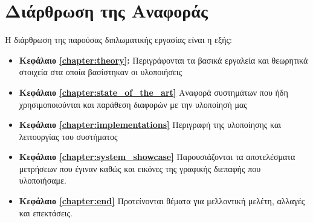 \newpage

\section{Διάρθρωση της Αναφοράς}
\label{section:layout}

Η διάρθρωση της παρούσας διπλωματικής εργασίας είναι η εξής:

\begin{itemize}
  \item{\textbf{Κεφάλαιο \ref{chapter:theory}:} 
		Περιγράφονται τα βασικά εργαλεία και θεωρητικά στοιχεία
		στα οποία βασίστηκαν οι υλοποιήσεις
    }
  \item{\textbf{Κεφάλαιο \ref{chapter:state_of_the_art}} Αναφορά συστημάτων που ήδη χρησιμοποιούνται	
		και παράθεση διαφορών με την υλοποίησή μας
    }
  \item{\textbf{Κεφάλαιο \ref{chapter:implementations}} Περιγραφή της υλοποίησης και λειτουργίας του συστήματος
    }
  \item{\textbf{Κεφάλαιο \ref{chapter:system_showcase}} Παρουσιάζονται τα αποτελέσματα μετρήσεων
    που έγιναν καθώς και εικόνες της γραφικής διεπαφής που υλοποιήσαμε.
    }
  \item{\textbf{Κεφάλαιο \ref{chapter:end}} Προτείνονται θέματα για μελλοντική
      μελέτη, αλλαγές και επεκτάσεις.
    }
\end{itemize}
